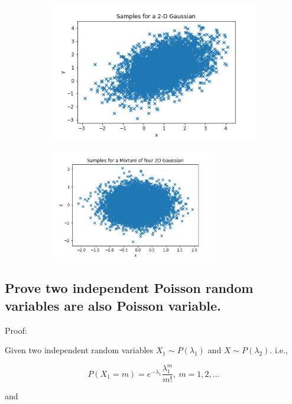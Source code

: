 \documentclass[english,11pt]{article}
\begin{document}
\begin{figure}[h]
\begin{subfigure}{.5\textwidth}
\centering
\includegraphics[width=.8\linewidth]{samplefigs/fig3.png}
\end{subfigure}%
\begin{subfigure}{.5\textwidth}
\centering
\includegraphics[width=0.8\textwidth]{samplefigs/fig4.png}
\end{subfigure}
\end{figure}


\subsection{Prove two independent Poisson random variables are also Poisson variable.}

Proof:

Given two independent random variables $X_{1}\sim P(\lambda_{1})$
and $X\sim P(\lambda_{2})$. i.e.,

\begin{equation}
P(X_{1}=m)=e^{-\lambda_{1}}\frac{\lambda_{1}^{m}}{m!},\ m=1,2,...    
\end{equation}


and
\end{document}
